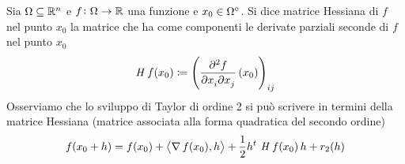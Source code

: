 \begin{definition}
	Sia $ \Omega \subseteq \mathbb{R}^n $ e $ f \colon \Omega \to \mathbb{R} $ una funzione e $ x_0 \in {\Omega}^{\circ} $. Si dice matrice Hessiana di $ f $ nel punto $ x_0 $ la matrice che ha come componenti le derivate parziali seconde di $ f $ nel punto $ x_0 $
	\begin{equation}
		\hess{f}(x_0) \coloneqq \left(\dmd{f}{2}{x_i}{}{x_j}{} (x_0)\right)_{ij} 
	\end{equation}
	Osserviamo che lo sviluppo di Taylor di ordine 2 si può scrivere in termini della matrice Hessiana (matrice associata alla forma quadratica del secondo ordine)
	\begin{equation}
		f(x_0 + h) = f(x_0) + \left\langle \operatorname{\nabla}{f}(x_0), h \right\rangle + \frac{1}{2} h^t \, \operatorname{\mathit{H}}{f}(x_0) \, h + r_2(h)
	\end{equation}
\end{definition}

